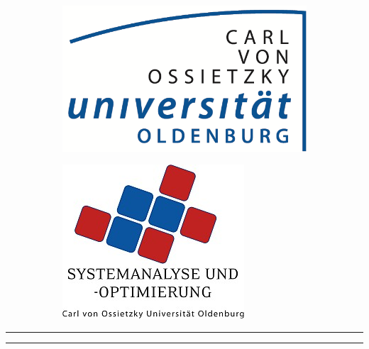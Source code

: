 \documentclass
[
	12pt, %
	a4paper, %
	twoside, %
	openany, %
	chapterprefix, %
	listof=totoc, %
]{scrbook}
\newcommand*{\universitaet}[1]{\def\universitaet{#1}}
\newcommand*{\fach}[1]{\def\fach{#1}}
\newcommand*{\arbeitsart}[1]{\def\arbeitsart{#1}}
\newcommand*{\titel}[1]{\def\titel{#1}}
\begin{document}
\frontmatter %

\makeatletter
\begin{titlepage}
\centering
\begin{figure}[htb]
  \centering
  \begin{subfigure}{0.5\textwidth}
    \centering
    \includegraphics[scale=1.8]{assets/img/uni_ol_logo.png}
    \end{subfigure}%
    \begin{subfigure}{0.5\textwidth}
      \centering
      \includegraphics[scale=0.35]{assets/img/abteilungslogo.jpg}
    \end{subfigure}
\end{figure}

{\scshape\Large\universitaet\par}
\vspace{1cm}
{\scshape\normalsize\fach\par}
{\scshape\normalsize\arbeitsart\par}

\vfill

\hrule
\vspace{1cm}
{\LARGE\bfseries\titel\par}
\vspace{1cm}
\hrule


\end{titlepage}
\end{document}
